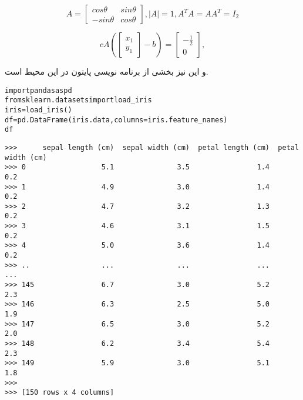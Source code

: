 \documentclass[12pt,usenames,dvipsnames]{report}\usepackage[]{graphicx}\usepackage[]{xcolor}
\makeatletter
\newenvironment{kframe}{%
 \def\at@end@of@kframe{}%
 \ifinner\ifhmode%
  \def\at@end@of@kframe{\end{minipage}}%
  \begin{minipage}{\columnwidth}%
 \fi\fi%
 \def\FrameCommand##1{\hskip\@totalleftmargin \hskip-\fboxsep
 \colorbox{shadecolor}{##1}\hskip-\fboxsep
     \hskip-\linewidth \hskip-\@totalleftmargin \hskip\columnwidth}%
 \MakeFramed {\advance\hsize-\width
   \@totalleftmargin\z@ \linewidth\hsize
   \@setminipage}}%
 {\par\unskip\endMakeFramed%
 \at@end@of@kframe}
\newenvironment{knitrout}{}{} %
\makeatother
\begin{document}
\begin{equation}
	A = \begin{bmatrix}
			cos \theta &  sin \theta \\
			-sin \theta & cos \theta
		\end{bmatrix}, |A| = 1, A^TA = AA^T = I_2
\end{equation}


\begin{equation*}
 cA \left(\begin{bmatrix*}
x_1 \\
y_1
\end{bmatrix*}-b\right) = \begin{bmatrix}
-\frac{1}{2}\\
0
\end{bmatrix},
\end{equation*}

و این نیز بخشی از برنامه نویسی پایتون در این محیط است.

\begin{knitrout}
\color{fgcolor}\begin{kframe}
\latin 
\begin{alltt}
import pandas as pd
from sklearn.datasets import load_iris
iris = load_iris()
df = pd.DataFrame(iris.data,columns = iris.feature_names)
df
\end{alltt}
\persian 
\latin 
\begin{verbatim}
>>>      sepal length (cm)  sepal width (cm)  petal length (cm)  petal width (cm)
>>> 0                  5.1               3.5                1.4               0.2
>>> 1                  4.9               3.0                1.4               0.2
>>> 2                  4.7               3.2                1.3               0.2
>>> 3                  4.6               3.1                1.5               0.2
>>> 4                  5.0               3.6                1.4               0.2
>>> ..                 ...               ...                ...               ...
>>> 145                6.7               3.0                5.2               2.3
>>> 146                6.3               2.5                5.0               1.9
>>> 147                6.5               3.0                5.2               2.0
>>> 148                6.2               3.4                5.4               2.3
>>> 149                5.9               3.0                5.1               1.8
>>> 
>>> [150 rows x 4 columns]
\end{verbatim}
\persian 
\end{kframe}
\end{knitrout}
\end{document}
